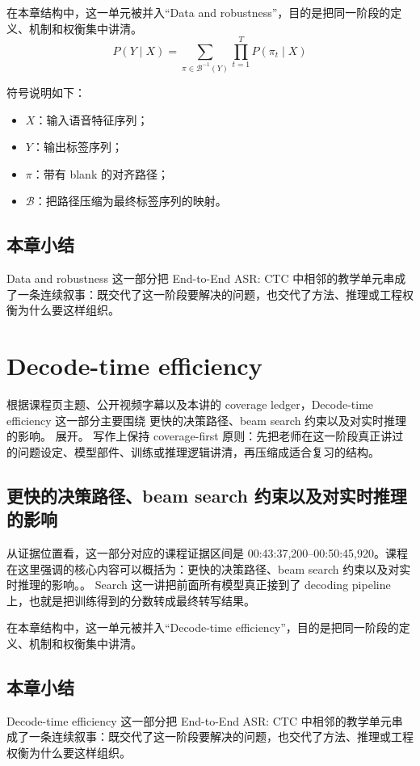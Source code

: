 \documentclass[a4paper]{article}
\begin{document}
在本章结构中，这一单元被并入“Data and robustness”，目的是把同一阶段的定义、机制和权衡集中讲清。
\[
P(Y \mid X) = \sum_{\pi \in \mathcal{B}^{-1}(Y)} \prod_{t=1}^{T} P(\pi_t \mid X)
\]

符号说明如下：
\begin{itemize}
\item $X$：输入语音特征序列；
\item $Y$：输出标签序列；
\item $\pi$：带有 blank 的对齐路径；
\item $\mathcal{B}$：把路径压缩为最终标签序列的映射。
\end{itemize}

\subsection{本章小结}
Data and robustness 这一部分把 End-to-End ASR: CTC 中相邻的教学单元串成了一条连续叙事：既交代了这一阶段要解决的问题，也交代了方法、推理或工程权衡为什么要这样组织。

\section{Decode-time efficiency}
根据课程页主题、公开视频字幕以及本讲的 coverage ledger，Decode-time efficiency 这一部分主要围绕 更快的决策路径、beam search 约束以及对实时推理的影响。 展开。
写作上保持 coverage-first 原则：先把老师在这一阶段真正讲过的问题设定、模型部件、训练或推理逻辑讲清，再压缩成适合复习的结构。

\subsection{更快的决策路径、beam search 约束以及对实时推理的影响}
从证据位置看，这一部分对应的课程证据区间是 00:43:37,200--00:50:45,920。课程在这里强调的核心内容可以概括为：更快的决策路径、beam search 约束以及对实时推理的影响。。
Search 这一讲把前面所有模型真正接到了 decoding pipeline 上，也就是把训练得到的分数转成最终转写结果。

在本章结构中，这一单元被并入“Decode-time efficiency”，目的是把同一阶段的定义、机制和权衡集中讲清。

\subsection{本章小结}
Decode-time efficiency 这一部分把 End-to-End ASR: CTC 中相邻的教学单元串成了一条连续叙事：既交代了这一阶段要解决的问题，也交代了方法、推理或工程权衡为什么要这样组织。
\end{document}
